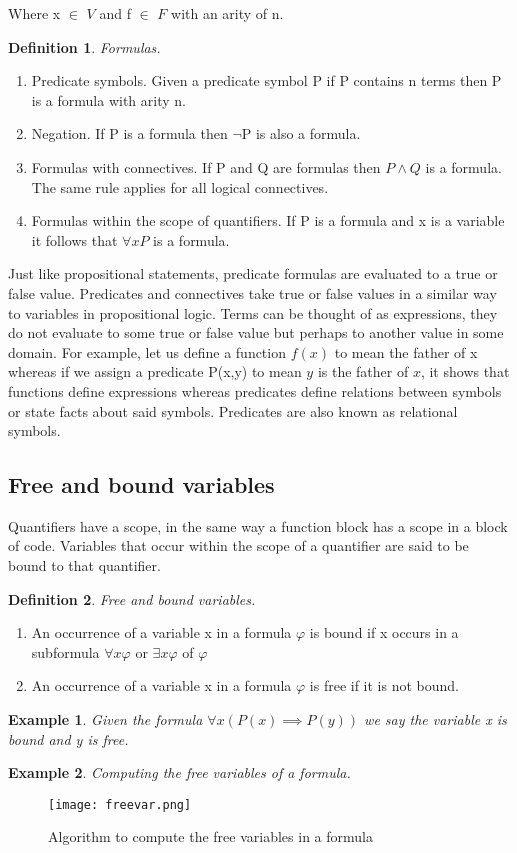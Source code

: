 \documentclass{article}%
\newtheorem{definition}{Definition}
\newtheorem{exmp}{Example}[section]
\begin{document}
Where x $\in$ $V$ and f $\in$ $F$ with an arity of n. 
\begin{definition}
Formulas. 
\end{definition}
\begin{enumerate}
\item Predicate symbols. Given a predicate symbol P  if P contains n terms then P is a formula with arity n. 
\item Negation. If P is a formula then $\neg$P is also a formula. 
\item Formulas with connectives. If P and Q are formulas then $P \land Q$ is a formula. The same rule applies for all logical connectives. 
\item Formulas within the scope of quantifiers. If P is a formula and x is a variable it follows that $\forall{x}P$ is a formula.
\end{enumerate}
Just like propositional statements, predicate formulas are evaluated to a true or false value. Predicates and connectives take true or false values in a similar way to variables in propositional logic. Terms can be thought of as expressions, they do not evaluate to some true or false value but perhaps to another value in some domain. For example, let us define a function $f(x)$ to mean the father of x whereas if we assign a predicate P(x,y) to mean $y$ is the father of $x$, it shows that functions define expressions \cite{struth_2019} whereas predicates define relations between symbols or state facts about said symbols. Predicates are also known as relational symbols. 
\subsection{Free and bound variables}
Quantifiers have a scope, in the same way a function block has a scope in a block of code. Variables that occur within the scope of a quantifier are said to be bound to that quantifier. 
\begin{definition}
Free and bound variables. 
\end{definition}
\begin{enumerate}
\item An occurrence of a variable x in a formula $\varphi$ is bound if x occurs in a subformula $\forall{x}\varphi$ or $\exists{x}\varphi$ of $\varphi$ \cite{struth_2019}
\item An occurrence of a variable x in a formula $\varphi$ is free if it is not bound. \cite{struth_2019}
\end{enumerate}
\begin{exmp}
Given the formula $\forall{x}(P(x) \implies P(y))$ we say the variable x is bound and y is free. 
\end{exmp}
\begin{exmp}
Computing the free variables of a formula. 
\end{exmp}
\begin{figure}[h!]
\centering
\texttt{[image: freevar.png]}
\caption{Algorithm to compute the free variables in a formula} \cite{struth_2019}
\label{fig:expansionrules}
\end{figure}
\end{document}
